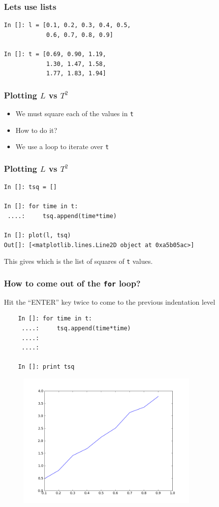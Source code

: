 \documentclass[14pt,compress]{beamer}
\newcounter{time}
\newcommand{\typ}[1]{\lstinline{#1}}
\newcommand{\kwrd}[1]{ \texttt{\textbf{\color{blue}{#1}}}  }
\begin{document}
\begin{frame}[fragile]
\frametitle{Lets use lists}
\begin{lstlisting}
In []: l = [0.1, 0.2, 0.3, 0.4, 0.5, 
            0.6, 0.7, 0.8, 0.9]

In []: t = [0.69, 0.90, 1.19, 
            1.30, 1.47, 1.58, 
            1.77, 1.83, 1.94]
\end{lstlisting}
\end{frame}

\begin{frame}[fragile]
\frametitle{Plotting $L$ vs $T^2$}
\begin{itemize}
\item We must square each of the values in \typ{t}
\item How to do it?
\item We use a \kwrd{for} loop to iterate over \typ{t}
\end{itemize}
\end{frame}

\begin{frame}[fragile]
\frametitle{Plotting $L$ vs $T^2$}
\begin{lstlisting}
In []: tsq = []

In []: for time in t:
 ....:     tsq.append(time*time)

In []: plot(l, tsq)
Out[]: [<matplotlib.lines.Line2D object at 0xa5b05ac>]
\end{lstlisting}
This gives \kwrd{tsq} which is the list of squares of \typ{t} values.
\end{frame}

\begin{frame}[fragile]
  \frametitle{How to come out of the \texttt{for} loop?}
  Hit the ``ENTER'' key twice to come to the previous indentation level
  \begin{lstlisting}
    In []: for time in t:
     ....:     tsq.append(time*time)
     ....:     
     ....:     

    In []: print tsq
  \end{lstlisting}
\end{frame}

\begin{frame}[fragile]
\begin{figure}
\includegraphics[width=3.5in]{data/L-TSq-limited.png}
\end{figure}
\end{frame}
\end{document}
